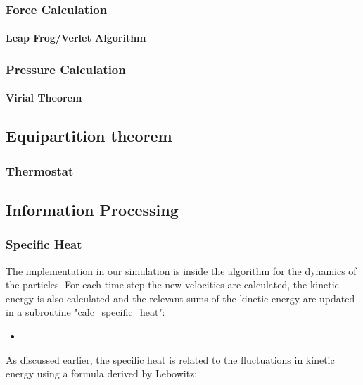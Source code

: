\documentclass[
10pt, %
a4paper, %
oneside, %
headinclude,footinclude, %
BCOR5mm, %
]{scrartcl}
\newcommand{\insertcode}[2]{\begin{itemize}\item[]\end{itemize}} %
\begin{document}
 
\subsubsection{Force Calculation}

\paragraph{Leap Frog/Verlet Algorithm}

\subsubsection{Pressure Calculation}

\paragraph{Virial Theorem}

\subsection{Equipartition theorem}

\subsubsection{Thermostat}

\subsection{Information Processing}

\subsubsection{Specific Heat}

The implementation in our simulation is inside the algorithm for the dynamics of the particles. For each time step the new velocities are calculated, the kinetic energy is also calculated and the relevant sums of the kinetic energy are updated in a subroutine "calc\_specific\_heat":

\insertcode{"Scripts/specific_heat_snippet_1.f90"}{Updating the relevant sums of the kinetic energy} %

\noindent
As discussed earlier, the specific heat is related to the fluctuations in kinetic energy using a formula derived by Lebowitz\cite{Duane:1985lz}:
\end{document}
